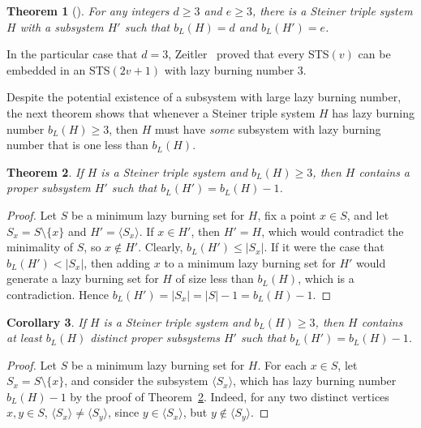 \documentclass[12pt]{article}
\newtheorem{theorem}{Theorem}[section]
\newtheorem{corollary}[theorem]{Corollary}
\theoremstyle{definition}
\numberwithin{table}{section}
\begin{document}
\begin{theorem}[\cite{Hilton1977}]
For any integers $d \geq 3$ and $e \geq 3$, there is a Steiner triple system $H$ with a subsystem $H'$ such that $b_L(H)=d$ and $b_L(H')=e$.
\end{theorem}

\noindent
In the particular case that $d=3$, Zeitler~\cite{Zeitler1985} proved that every STS$(v)$ can be embedded in an STS$(2v+1)$ with lazy burning number $3$.

Despite the potential existence of a subsystem with large lazy burning number, the next theorem shows that whenever a Steiner triple system $H$ has lazy burning number $b_L(H) \geq 3$, then $H$ must have {\em some} subsystem with lazy burning number that is one less than $b_L(H)$.

\begin{theorem}
\label{theorem-subSTS}
If $H$ is a Steiner triple system and $b_L(H) \geq 3$, then $H$ contains a proper subsystem $H'$ such that $b_L(H') = b_L(H) - 1$.
\end{theorem}



\begin{proof}
Let $S$ be a minimum lazy burning set for $H$,
fix a point $x \in S$, and let $S_x = S \setminus \{x\}$ and $H'=\langle S_x \rangle$.
If $x\in H'$, then $H' = H$, which would contradict the minimality of $S$, so $x \notin H'$. 
Clearly, $b_L(H') \leq |S_x|$.  If it were the case that $b_L(H') < |S_x|$, then adding $x$ to a minimum lazy burning set for $H'$ would generate a lazy burning set for $H$ of size less than $b_L(H)$, which is a contradiction.  Hence $b_L(H') = |S_x| = |S| - 1 = b_L(H) -1.$
\end{proof}

\begin{corollary}
\label{corollary-subSTS}
If $H$ is a Steiner triple system and $b_L(H) \geq 3$, then $H$ contains at least $b_L(H)$ distinct proper subsystems $H'$ such that $b_L(H') = b_L(H) - 1$.
\end{corollary}

\begin{proof}
    Let $S$ be a minimum lazy burning set for $H$. For each $x\in S$, let $S_x=S\setminus\{x\}$, and consider the subsystem $\langle S_x\rangle$, which has lazy burning number $b_L(H)-1$ by the proof of Theorem~\ref{theorem-subSTS}. Indeed, for any two distinct vertices $x,y\in S$, $\langle S_x\rangle\neq \langle S_y\rangle$, since $y\in \langle S_x\rangle$, but $y\notin \langle S_y\rangle$. 
\end{proof}
\end{document}
